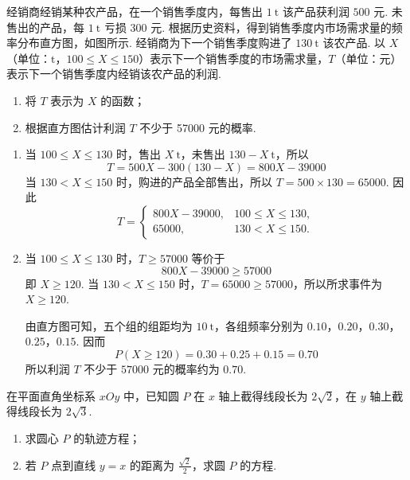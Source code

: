 \begin{problem}
经销商经销某种农产品，在一个销售季度内，每售出 \(1\mathrm{~t}\) 该产品获利润 \(500\text{ 元}\). 未售出的产品，每 \(1\mathrm{~t}\) 亏损 \(300\text{ 元}\). 根据历史资料，得到销售季度内市场需求量的频率分布直方图，如图所示. 经销商为下一个销售季度购进了 \(130\mathrm{~t}\) 该农产品. 以 \(X\)（单位：\(\mathrm{t}\)，\(100 \leqslant X \leqslant 150\)）表示下一个销售季度的市场需求量，\(T\)（单位：\(\text{元}\)）表示下一个销售季度内经销该农产品的利润.

\begin{enumerate}
\item 将 \(T\) 表示为 \(X\) 的函数；
\item 根据直方图估计利润 \(T\) 不少于 57000 元的概率.
\end{enumerate}

\end{problem}

\begin{solution}
\begin{enumerate}
\item 当 \(100\leqslant X\leqslant 130\) 时，售出 \(X\mathrm{~t}\)，未售出 \(130-X\mathrm{~t}\)，所以
\[
T=500X-300(130-X)=800X-39000
\]
当 \(130<X\leqslant 150\) 时，购进的产品全部售出，所以 \(T=500\times130=65000\). 因此
\[
T=\begin{cases}
800X-39000,&100\leqslant X\leqslant130,\\
65000,&130<X\leqslant150.
\end{cases}
\]
\item 当 \(100\leqslant X\leqslant130\) 时，\(T\geqslant57000\) 等价于
\[
800X-39000\geqslant57000
\]
即 \(X\geqslant120\). 当 \(130<X\leqslant150\) 时，\(T=65000\geqslant57000\)，所以所求事件为 \(X\geqslant120\).

由直方图可知，五个组的组距均为 \(10\mathrm{~t}\)，各组频率分别为 \(0.10\)，\(0.20\)，\(0.30\)，\(0.25\)，\(0.15\). 因而
\[
P(X\geqslant120)=0.30+0.25+0.15=0.70
\]
所以利润 \(T\) 不少于 \(57000\) 元的概率约为 \(0.70\).
\end{enumerate}
\end{solution}

\FloatBarrier

\begin{problem}
在平面直角坐标系 \(xOy\) 中，已知圆 \(P\) 在 \(x\) 轴上截得线段长为 \(2\sqrt{2}\)，在 \(y\) 轴上截得线段长为 \(2\sqrt{3}\).
\begin{enumerate}
\item 求圆心 \(P\) 的轨迹方程；
\item 若 \(P\) 点到直线 \(y = x\) 的距离为 \(\frac{\sqrt{2}}{2}\)，求圆 \(P\) 的方程.
\end{enumerate}
\end{problem}

